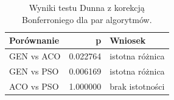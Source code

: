 \begin{table}
\caption{Wyniki testu Dunna z korekcją Bonferroniego dla par algorytmów.}
\label{tab:dunn_pairs}
\begin{tabular}{lrl}
\toprule
Porównanie & p & Wniosek \\
\midrule
GEN vs ACO & 0.022764 & istotna różnica \\
GEN vs PSO & 0.006169 & istotna różnica \\
ACO vs PSO & 1.000000 & brak istotności \\
\bottomrule
\end{tabular}
\end{table}
